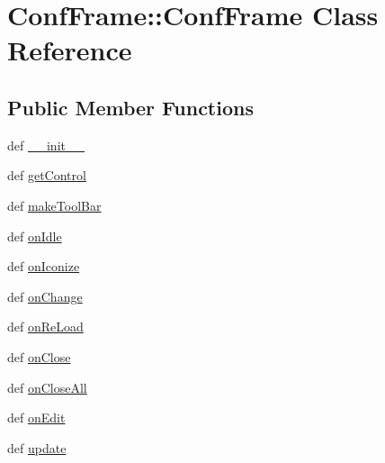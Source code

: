 \hypertarget{classConfFrame_1_1ConfFrame}{
\section{ConfFrame::ConfFrame Class Reference}
\label{classConfFrame_1_1ConfFrame}
}
\subsection*{Public Member Functions}
\begin{DoxyCompactItemize}
\item 
def \hyperlink{classConfFrame_1_1ConfFrame_a5df54c06eb14db3e13ef26fd046194a6}{\_\-\_\-init\_\-\_\-}
\item 
def \hyperlink{classConfFrame_1_1ConfFrame_ac5c3c5b5f7c27b499ea1613d3390940f}{getControl}
\item 
def \hyperlink{classConfFrame_1_1ConfFrame_a1908e2575a1d99499a5769a381f4180e}{makeToolBar}
\item 
def \hyperlink{classConfFrame_1_1ConfFrame_abcad6b85b23eb0a965ba4befc63f0631}{onIdle}
\item 
def \hyperlink{classConfFrame_1_1ConfFrame_a01aaecf1b7070b1152dbcd6d77fac983}{onIconize}
\item 
def \hyperlink{classConfFrame_1_1ConfFrame_ad9099fca804e54f6a2f0423fe9a1cd62}{onChange}
\item 
def \hyperlink{classConfFrame_1_1ConfFrame_aabe3ae34e563a3bfc351988b08754831}{onReLoad}
\item 
def \hyperlink{classConfFrame_1_1ConfFrame_a15f8f6f018afdebf8e6de863f41d1743}{onClose}
\item 
def \hyperlink{classConfFrame_1_1ConfFrame_acbfa2caa776d95eefb6bcb5e26eb9dc6}{onCloseAll}
\item 
def \hyperlink{classConfFrame_1_1ConfFrame_a85437dc1587288750f6a1357e1b4d84c}{onEdit}
\item 
def \hyperlink{classConfFrame_1_1ConfFrame_a8bb0ee21547d813d31a240c4cb74c69d}{update}
\end{DoxyCompactItemize}
